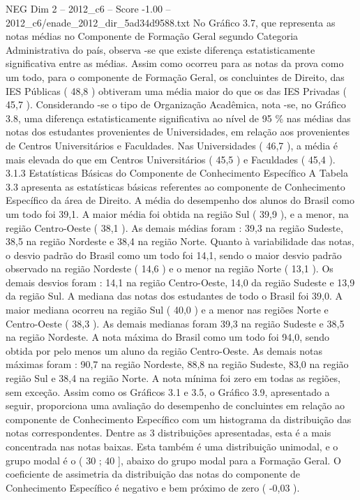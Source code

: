 \begin{textsample}{NEG Dim 2 – 2012\_c6 – Score -1.00 – 2012\_c6/enade\_2012\_dir\_5ad34d9588.txt}
No Gráfico 3.7, que representa as notas médias no Componente de Formação Geral segundo Categoria Administrativa do país, observa -se que existe diferença estatisticamente significativa entre as médias.
Assim como ocorreu para as notas da prova como um todo, para o componente de Formação Geral, os concluintes de Direito, das IES Públicas ( 48,8 ) obtiveram uma média maior do que os das IES Privadas ( 45,7 ).
Considerando -se o tipo de Organização Acadêmica, nota -se, no Gráfico 3.8, uma diferença estatisticamente significativa ao nível de 95 \% nas médias das notas dos estudantes provenientes de Universidades, em relação aos provenientes de Centros Universitários e Faculdades.
Nas Universidades ( 46,7 ), a média é mais elevada do que em Centros Universitários ( 45,5 ) e Faculdades ( 45,4 ). 3.1.3 Estatísticas Básicas do Componente de Conhecimento Específico A Tabela 3.3 apresenta as estatísticas básicas referentes ao componente de Conhecimento Específico da área de Direito.
A média do desempenho dos alunos do Brasil como um todo foi 39,1.
A maior média foi obtida na região Sul ( 39,9 ), e a menor, na região Centro-Oeste ( 38,1 ).
As demais médias foram : 39,3 na região Sudeste, 38,5 na região Nordeste e 38,4 na região Norte.
Quanto à variabilidade das notas, o desvio padrão do Brasil como um todo foi 14,1, sendo o maior desvio padrão observado na região Nordeste ( 14,6 ) e o menor na região Norte ( 13,1 ).
Os demais desvios foram : 14,1 na região Centro-Oeste, 14,0 da região Sudeste e 13,9 da região Sul.
A mediana das notas dos estudantes de todo o Brasil foi 39,0.
A maior mediana ocorreu na região Sul ( 40,0 ) e a menor nas regiões Norte e Centro-Oeste ( 38,3 ).
As demais medianas foram 39,3 na região Sudeste e 38,5 na região Nordeste.
A nota máxima do Brasil como um todo foi 94,0, sendo obtida por pelo menos um aluno da região Centro-Oeste.
As demais notas máximas foram : 90,7 na região Nordeste, 88,8 na região Sudeste, 83,0 na região região Sul e 38,4 na região Norte.
A nota mínima foi zero em todas as regiões, sem exceção.
Assim como os Gráficos 3.1 e 3.5, o Gráfico 3.9, apresentado a seguir, proporciona uma avaliação do desempenho de concluintes em relação ao componente de Conhecimento Específico com um histograma da distribuição das notas correspondentes.
Dentre as 3 distribuições apresentadas, esta é a mais concentrada nas notas baixas.
Esta também é uma distribuição unimodal, e o grupo modal é o ( 30 ; 40 ], abaixo do grupo modal para a Formação Geral.
O coeficiente de assimetria da distribuição das notas do componente de Conhecimento Específico é negativo e bem próximo de zero ( -0,03 ).

\end{textsample}
